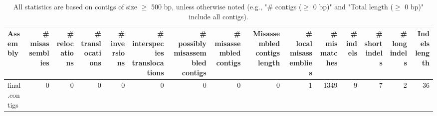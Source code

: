 \documentclass[12pt,a4paper]{article}
\begin{document}
\begin{table}[ht]
\begin{center}
\caption{All statistics are based on contigs of size $\geq$ 500 bp, unless otherwise noted (e.g., "\# contigs ($\geq$ 0 bp)" and "Total length ($\geq$ 0 bp)" include all contigs).}
\begin{tabular}{|l*{14}{|r}|}
\hline
Assembly & \# misassemblies &     \# relocations &     \# translocations &     \# inversions &     \# interspecies translocations & \# possibly misassembled contigs & \# misassembled contigs & Misassembled contigs length & \# local misassemblies & \# mismatches & \# indels &     \# short indels &     \# long indels & Indels length \\ \hline
final.contigs & 0 & 0 & 0 & 0 & 0 & 0 & 0 & 0 & 1 & 1349 & 9 & 7 & 2 & 36 \\ \hline
\end{tabular}
\end{center}
\end{table}
\end{document}

